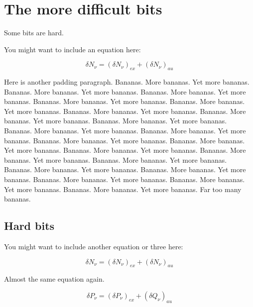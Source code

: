 \documentclass[12pt,a4paper]{report}
\begin{document}
\section{The more difficult bits}
Some bits are hard.

You might want to include an equation here:

\begin{equation}
  \delta N_{\nu} = (\delta N_{\nu})_{ex} + (\delta N_{\nu})_{au} 
  \label{equation:delsplit}
\end{equation}


Here is another padding paragraph.  Bananas.  More bananas.  Yet more
bananas.  Bananas.  More bananas.  Yet more bananas.  Bananas.  More
bananas.  Yet more bananas.  Bananas.  More bananas.  Yet more
bananas.  Bananas.  More bananas.  Yet more bananas.  Bananas.  More
bananas.  Yet more bananas.  Bananas.  More bananas.  Yet more
bananas.  Bananas.  More bananas.  Yet more bananas.  Bananas.  More
bananas.  Yet more bananas.  Bananas.  More bananas.  Yet more
bananas.  Bananas.  More bananas.  Yet more bananas.  Bananas.  More
bananas.  Yet more bananas.  Bananas.  More bananas.  Yet more
bananas.  Bananas.  More bananas.  Yet more bananas.  Bananas.  More
bananas.  Yet more bananas.  Bananas.  More bananas.  Yet more
bananas.  Bananas.  More bananas.  Yet more bananas.  Bananas.  More
bananas.  Yet more bananas.  Bananas.  More bananas.  Yet more
bananas.  Bananas.  More bananas.  Yet more bananas.  Far too many
bananas.

\subsection{Hard bits}
You might want to include another equation or three here:

\begin{equation}
  \delta N_{\nu} = (\delta N_{\nu})_{ex} + (\delta N_{\nu})_{au} 
  \label{equation:delsplit2}
\end{equation}

Almost the same equation again.

\begin{equation}
  \delta P_{\nu} = (\delta P_{\nu})_{ex} + (\delta Q_{\nu})_{au} 
  \label{equation:delsplit3}
\end{equation}
\end{document}
